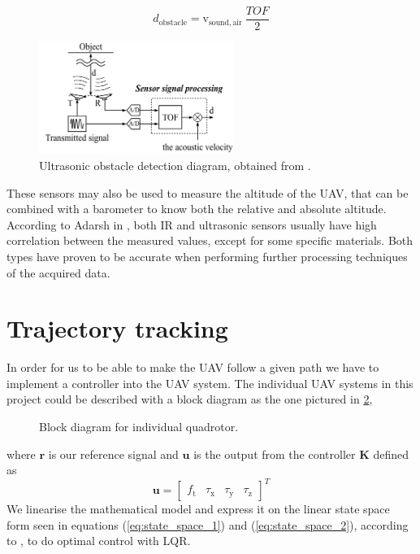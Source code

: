 \documentclass[journal]{IEEEtran}
\newcommand*{\subb}[1]{_{\mathrm{#1}}}
\begin{document}
	\begin{equation} \label{eq:ultrasonic_formula}
	d\subb{obstacle} = \textrm{v}\subb{sound, air} \ \frac{TOF}{2}
	\end{equation}
	\begin{figure}[h]
		\centering
		\includegraphics[width=2.5in]{ultrasonic2}
		\caption{Ultrasonic obstacle detection diagram, obtained from \cite{hirata2008cross}.}
		\label{fig:ultrasonic}
	\end{figure}
	
	These sensors may also be used to measure the altitude of the UAV, that can be combined with a barometer to know both the relative and absolute altitude. According to Adarsh in \cite{AdarshS2016PcoI}, both IR and ultrasonic sensors usually have high correlation between the measured values, except for some specific materials. Both types have proven to be accurate when performing further processing techniques of the acquired data.
	
	
	\section{Trajectory tracking}
	In order for us to be able to make the UAV follow a given path we have to implement a controller into the UAV system. The individual UAV systems in this project could be described with a block diagram as the one pictured in \figurename{\ref{fig:block_diagram}},
	\begin{figure}[h]
		\centering
		
		\caption{Block diagram for individual quadrotor.}
		\label{fig:block_diagram}
	\end{figure}	
	where $\bm{r}$ is our reference signal and $\bm{u}$ is the output from the controller $\bm{K}$ defined as
	\begin{equation} \label{eq:uvect}
		\bm{u} = \left[ {\begin{array}{cccc}	
    f\subb{t} & \tau\subb{x} & \tau\subb{y} & \tau\subb{z}
	\end{array} } \right]^T
	\end{equation}
	 We linearise the mathematical model and express it on the linear state space form seen in equations (\ref{eq:state_space_1}) and (\ref{eq:state_space_2}), according to \cite{SabatinoFrancesco2015Qcmn},  to do optimal control with LQR.
\end{document}
